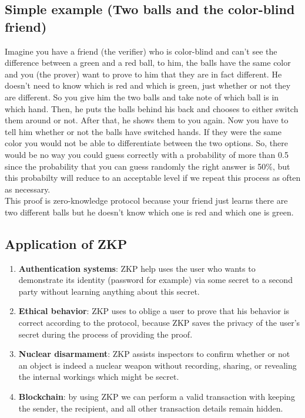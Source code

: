 \documentclass[12pt,a4paper]{article}
\begin{document}
\subsection{Simple example (Two balls and the color-blind friend)}
Imagine you have a friend (the verifier) who is color-blind and can’t see the difference between a green
and a red ball, to him, the balls have the same color and you (the prover) want to prove to him that they are in fact different.
He doesn’t need to know which is red and which is green, just whether or not they are different.
So you give him the two balls and take note of which ball is in which hand. Then, he puts the balls behind his back and chooses to either switch them around or not.
After that, he shows them to you again. Now you have to tell him whether or not the balls have switched hands. If they were the same color you would not be able to differentiate between the two options. So, there would be no way you could guess correctly with a probability of more than 0.5 since the probability that you can guess randomly the right answer is 50$\%$, but this probabilty will reduce to an acceptable level if we repeat this process as often as necessary.\\
This proof is zero-knowledge protocol because your friend just learns there are two different balls but he doesn’t know which one is red and which one is green.
\subsection{Application of ZKP}
\begin{enumerate}	
	\item
	\begin{enumerate}
\textbf{Authentication systems}: ZKP help uses the user who wants to demonstrate its identity (password for example) via some secret to a second party without learning anything about this secret.
\end{enumerate}	
	\item
\begin{enumerate}
\textbf{Ethical behavior}:  ZKP uses to oblige a user to prove that his behavior is correct according to the protocol, because ZKP saves the privacy of the user’s secret during the process of providing the proof.
\end{enumerate}	
	\item
\begin{enumerate}
\textbf{Nuclear disarmament}: ZKP assists inspectors to confirm whether or not an object is indeed a nuclear weapon without recording, sharing, or revealing the internal workings which might be secret.
\end{enumerate}	
	\item
\begin{enumerate}
\textbf{Blockchain}: by using ZKP we can perform a valid transaction with keeping the sender, the recipient, and all other transaction details remain hidden.
\end{enumerate}	
\end{enumerate}	
\end{document}
